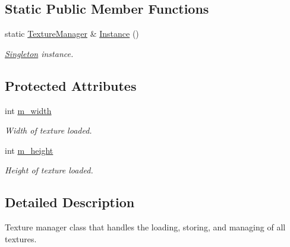 \subsection*{Static Public Member Functions}
\begin{CompactItemize}
\item 
static \hyperlink{class_texture_manager}{TextureManager} \& \hyperlink{class_texture_manager_81a2f2ac1876be84e0a0a472199679d5}{Instance} ()
\begin{CompactList}\small\item\em \hyperlink{class_singleton}{Singleton} instance. \item\end{CompactList}\end{CompactItemize}
\subsection*{Protected Attributes}
\begin{CompactItemize}
\item 
\hypertarget{class_texture_manager_289ca60892d452574645e7e31b6de897}{
int \hyperlink{class_texture_manager_289ca60892d452574645e7e31b6de897}{m\_\-width}}
\label{class_texture_manager_289ca60892d452574645e7e31b6de897}

\begin{CompactList}\small\item\em Width of texture loaded. \item\end{CompactList}\item 
\hypertarget{class_texture_manager_efa958081c8ef466c115e60d4f605449}{
int \hyperlink{class_texture_manager_efa958081c8ef466c115e60d4f605449}{m\_\-height}}
\label{class_texture_manager_efa958081c8ef466c115e60d4f605449}

\begin{CompactList}\small\item\em Height of texture loaded. \item\end{CompactList}\end{CompactItemize}


\subsection{Detailed Description}
Texture manager class that handles the loading, storing, and managing of all textures. 

